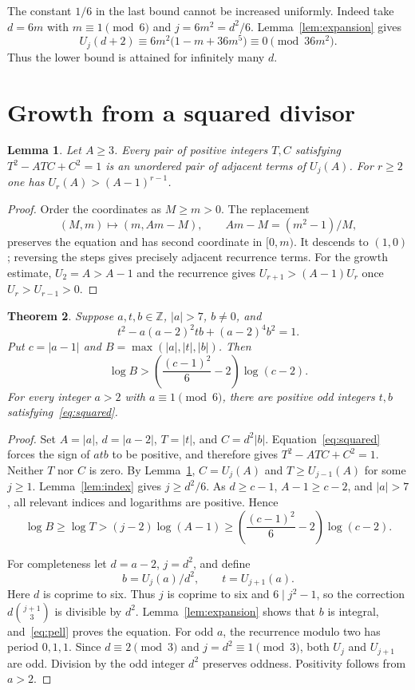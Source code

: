 \documentclass[11pt,a4paper]{article}
\newtheorem{theorem}{Theorem}[section]
\newtheorem{lemma}[theorem]{Lemma}
\newcommand{\Z}{\mathbb Z}\newcommand{\Q}{\mathbb Q}
\begin{document}
The constant $1/6$ in the last bound cannot be increased uniformly.
Indeed take $d=6m$ with $m\equiv1\pmod6$ and $j=6m^2=d^2/6$.
Lemma~\ref{lem:expansion} gives
\[
 U_j(d+2)\equiv6m^2\bigl(1-m+36m^5\bigr)\equiv0\pmod{36m^2}.
\]
Thus the lower bound is attained for infinitely many $d$.

\section{Growth from a squared divisor}

\begin{lemma}\label{lem:classification}
Let $A\ge3$. Every pair of positive integers $T,C$ satisfying
$T^2-ATC+C^2=1$ is an unordered pair of adjacent terms of $U_j(A)$.
For $r\ge2$ one has $U_r(A)>(A-1)^{r-1}$.
\end{lemma}
\begin{proof}
Order the coordinates as $M\ge m>0$. The replacement
\[
 (M,m)\longmapsto(m,Am-M),\qquad Am-M=(m^2-1)/M,
\]
preserves the equation and has second coordinate in $[0,m)$.
It descends to $(1,0)$; reversing the steps gives precisely adjacent
recurrence terms. For the growth estimate, $U_2=A>A-1$ and the
recurrence gives $U_{r+1}>(A-1)U_r$ once $U_r>U_{r-1}>0$.
\end{proof}

\begin{theorem}\label{thm:squared}
Suppose $a,t,b\in\Z$, $|a|>7$, $b\ne0$, and
\begin{equation}\label{eq:squared}
 t^2-a(a-2)^2tb+(a-2)^4b^2=1.
\end{equation}
Put $c=|a-1|$ and $B=\max(|a|,|t|,|b|)$. Then
\[
 \log B>
 \left(\frac{(c-1)^2}{6}-2\right)\log(c-2).
\]
For every integer $a>2$ with $a\equiv1\pmod6$, there are
positive odd integers $t,b$ satisfying~\eqref{eq:squared}.
\end{theorem}
\begin{proof}
Set $A=|a|$, $d=|a-2|$, $T=|t|$, and $C=d^2|b|$.
Equation~\eqref{eq:squared} forces the sign of $a t b$ to be
positive, and therefore gives $T^2-ATC+C^2=1$.
Neither $T$ nor $C$ is zero. By Lemma~\ref{lem:classification},
$C=U_j(A)$ and $T\ge U_{j-1}(A)$ for some $j\ge1$.
Lemma~\ref{lem:index} gives $j\ge d^2/6$.
As $d\ge c-1$, $A-1\ge c-2$, and $|a|>7$, all relevant
indices and logarithms are positive. Hence
\[
 \log B\ge\log T>(j-2)\log(A-1)
 \ge\left(\frac{(c-1)^2}{6}-2\right)\log(c-2).
\]

For completeness let $d=a-2$, $j=d^2$, and define
\[
                    b=U_j(a)/d^2,\qquad t=U_{j+1}(a).
\]
Here $d$ is coprime to six. Thus $j$ is coprime to six and
$6\mid j^2-1$, so the correction
$d\binom{j+1}{3}$ is divisible by $d^2$. Lemma~\ref{lem:expansion}
shows that $b$ is integral, and~\eqref{eq:pell} proves the equation.
For odd $a$, the recurrence modulo two has period $0,1,1$.
Since $d\equiv2\pmod3$ and $j=d^2\equiv1\pmod3$, both
$U_j$ and $U_{j+1}$ are odd. Division by the odd integer $d^2$
preserves oddness. Positivity follows from $a>2$.
\end{proof}
\end{document}
